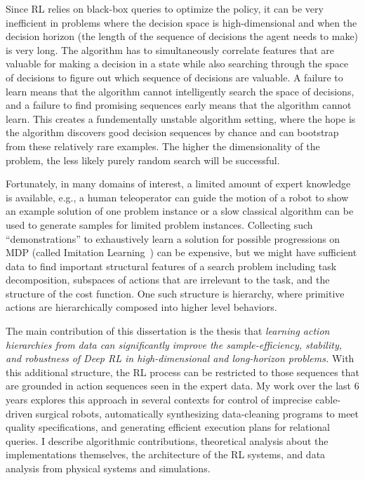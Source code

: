 Since RL relies on black-box queries to optimize the policy, it can be very inefficient in problems where the decision space is high-dimensional and when the decision horizon (the length of the sequence of decisions the agent needs to make) is very long. 
The algorithm has to simultaneously correlate features that are valuable for making a decision in a state while also searching through the space of decisions to figure out which sequence of decisions are valuable. A failure to learn means that the algorithm cannot intelligently search the space of decisions, and a failure to find promising sequences early means that the algorithm cannot learn.
This creates a fundementally unstable algorithm setting, where the hope is the algorithm discovers good decision sequences by chance and can bootstrap from these relatively rare examples.
The higher the dimensionality of the problem, the less likely purely random search will be successful. 

Fortunately, in many domains of interest, a limited amount of expert knowledge is available, e.g., a human teleoperator can guide the motion of a robot to show an example solution of one problem instance or a slow classical algorithm can be used to generate samples for limited problem instances.
Collecting such ``demonstrations'' to exhaustively learn a solution for possible progressions on MDP (called Imitation Learning~\cite{osa2018algorithmic}) can be expensive, but we might have sufficient data to find important structural features of a search problem including task decomposition, subspaces of actions that are irrelevant to the task, and the structure of the cost function.
One such structure is hierarchy, where primitive actions are hierarchically composed into higher level behaviors.

The main contribution of this dissertation is the thesis that \emph{learning action hierarchies from data can significantly improve the sample-efficiency, stability, and robustness of Deep RL in high-dimensional and long-horizon problems.} 
With this additional structure, the RL process can be restricted to those sequences that are grounded in action sequences seen in the expert data.
My work over the last 6 years explores this approach in several contexts for control of imprecise cable-driven surgical robots, automatically synthesizing data-cleaning programs to meet quality specifications, and generating efficient execution plans for relational queries. I describe algorithmic contributions, theoretical analysis about the implementations themselves, the architecture of the RL systems, and data analysis from physical systems and simulations.

